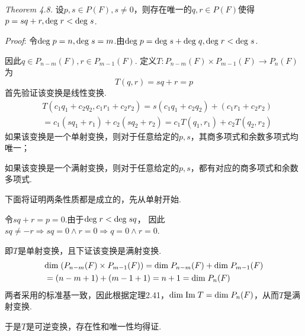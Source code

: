 \textit{Theorem 4.8.}
设\(p,s \in P(F),s \ne 0\)，则存在唯一的\(q,r \in P(F)\)使得\(p=sq+r,\mathrm{deg \;} r < \mathrm{deg \;} s\).

\textit{Proof}:
令\(\mathrm{deg \;} p=n,\mathrm{deg \;} s=m\).由\(\mathrm{deg \;} p=\mathrm{deg \;} s+\mathrm{deg \;} q,\mathrm{deg \;} r < \mathrm{deg \;} s\).

因此\(q \in P_{n-m}(F),r \in P_{m-1}(F)\).
定义\(T:P_{n-m}(F) \times P_{m-1}(F) \rightarrow P_{n}(F)\)为 
    \begin{equation*}
        T(q,r)=sq+r=p
    \end{equation*}
首先验证该变换是线性变换.
    \begin{align*}
        &T(c_1q_1+c_2q_2,c_1r_1+c_2r_2)=s(c_1q_1+c_2q_2)+(c_1r_1+c_2r_2) \\
        &=c_1(sq_1+r_1)+c_2(sq_2+r_2)=c_1T(q_1,r_1)+c_2T(q_2,r_2)
    \end{align*}
如果该变换是一个单射变换，则对于任意给定的\(p,s\)，其商多项式和余数多项式均唯一；

如果该变换是一个满射变换，则对于任意给定的\(p,s\)，都有对应的商多项式和余数多项式.

下面将证明两条性质都是成立的，先从单射开始.

令\(sq+r=p=0\).由于\(\mathrm{deg \;} r < \mathrm{deg \;} sq\)，
因此\(sq \ne -r \Rightarrow sq=0 \wedge r=0 \Rightarrow q=0 \wedge r=0\).

即\(T\)是单射变换，且下证该变换是满射变换.
    \begin{align*}
        &\mathrm{dim \;} (P_{n-m}(F) \times P_{m-1}(F))=\mathrm{dim \;} P_{n-m}(F)+\mathrm{dim \;} P_{m-1}(F) \\
        &=(n-m+1)+(m-1+1)=n+1=\mathrm{dim \;} P_n(F)
    \end{align*}
两者采用的标准基一致，因此根据定理2.41，\(\mathrm{dim \;} \mathrm{Im \;} T=\mathrm{dim \;}  P_n(F)\)，从而\(T\)是满射变换.

于是\(T\)是可逆变换，存在性和唯一性均得证.

